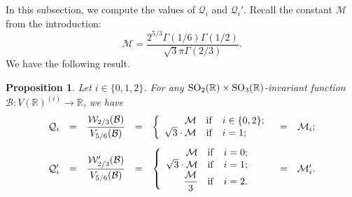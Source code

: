\documentclass{article}
\def\SO{{\rm SO}}
\def\R{{\mathbb R}}
\def\cB{{\mathcal B}}
\def\W{{\mathcal W}}
\newtheorem{proposition}[theorem]{Proposition}
\begin{document}
In this subsection, we compute the values of $\mathcal Q_i$ and $\mathcal Q_i'$. Recall the constant $\mathcal M$ from the introduction:
\begin{equation*}
\mathcal M= \frac{2^{5/3}\Gamma(1/6)\Gamma(1/2)}{\sqrt{3}\pi\Gamma(2/3)}.
\end{equation*}
We have the following result.
\begin{proposition}\label{prop:local_int_at_inf}
Let $i\in\{0,1,2\}$. For any $\SO_2(\R)\times\SO_3(\R)$-invariant function $\cB:V(\R)^{(i)}\to\R$, we have
\begin{equation*}
\begin{array}{ccrclcl}
\mathcal Q_i&=
& 
\displaystyle\frac{\W_{2/3}(\cB)}{V_{5/6}(\cB)}
&=&\displaystyle
\left\{
\begin{array}{rcl}
\mathcal M&{\rm if}&i\in\{0,2\};
\\
\sqrt{3}\cdot\mathcal M&{\rm if}&
i=1;
\end{array}
\right. &=& \mathcal M_i;
\\[.2in]
\mathcal Q_i'&=
&
\displaystyle\frac{\W'_{2/3}(\cB)}{ V_{5/6}(\cB)}
&=&\left\{
\begin{array}{rcl}
\mathcal M&{\rm if }& i=0;\\
\sqrt{3}\cdot \mathcal M&{\rm if }& i=1;\\
\displaystyle\frac{\mathcal M}{3}&{\rm if }& i=2.
\end{array}
\right.&=&\mathcal M_i'.
\end{array}
\end{equation*}
\end{proposition}
\end{document}
